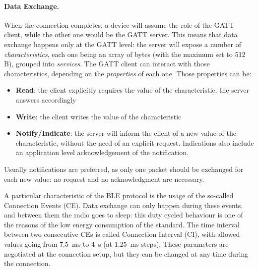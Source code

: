 \paragraph{Data Exchange.}When the connection completes, a device will assume the role of the GATT client, while the other one would be the GATT server. This means that data exchange happens only at the GATT level: the server will expose a number of \textit{characteristics}, each one being an array of bytes (with the maximum set to 512 B), grouped into \textit{services}. The GATT client can interact with those characteristics, depending on the \textit{properties} of each one. Those properties can be:
\begin{itemize}
    \item \textbf{Read}: the client explicitly requires the value of the characteristic, the server answers accordingly
    \item \textbf{Write}: the client writes the value of the characteristic
    \item \textbf{Notify/Indicate}: the server will inform the client of a new value of the characteristic, without the need of an explicit request. Indications also include an application level acknowledgement of the notification. 
\end{itemize}
Usually notifications are preferred, as only one packet should be exchanged for each new value: no request and no acknowledgment are necessary. 

A particular characteristic of the BLE protocol is the usage of the so-called Connection Events (CE). Data exchange can only happen during these events, and between them the radio goes to sleep: this duty cycled behaviour is one of the reasons of the low energy consumption of the standard. The time interval between two consecutive CEs is called Connection Interval (CI), with allowed values going from 7.5~ms to 4~s (at 1.25~ms steps). These parameters are negotiated at the connection setup, but they can be changed at any time during the connection. 

